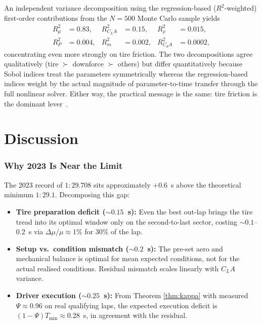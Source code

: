 \documentclass[11pt,twocolumn]{article}
\theoremstyle{definition}
\theoremstyle{remark}
\begin{document}
An independent variance decomposition using the regression-based
($R^2$-weighted) first-order contributions from the $N=500$ Monte Carlo
sample yields
\begin{align*}
  R^2_\mu &= 0.83, & R^2_{C_LA} &= 0.15, & R^2_\rho &= 0.015,\\
  R^2_P &= 0.004, & R^2_m &= 0.002, & R^2_{C_dA} &= 0.0002,
\end{align*}
concentrating even more strongly on tire friction. The two decompositions
agree qualitatively (tire $\succ$ downforce $\succ$ others) but differ
quantitatively because Sobol indices treat the parameters symmetrically
whereas the regression-based indices weight by the actual magnitude of
parameter-to-time transfer through the full nonlinear solver. Either way,
the practical message is the same: tire friction is the dominant
lever~\cite{tibshirani1997,saltelli2008}.



\part{Discussion}

\section{Why 2023 Is Near the Limit}
\label{sec:near-limit}

The 2023 record of $1\!:\!29.708$ sits approximately $+0.6$~s above the
theoretical minimum $1\!:\!29.1$. Decomposing this gap:

\begin{itemize}
  \item \textbf{Tire preparation deficit ($\sim 0.15$~s):} Even the best
        out-lap brings the tire tread into its optimal window only on the
        second-to-last sector, costing $\sim 0.1$--$0.2$~s via
        $\Delta \mu / \mu \approx 1\%$ for 30\% of the lap.
  \item \textbf{Setup vs.\ condition mismatch ($\sim 0.2$~s):} The pre-set
        aero and mechanical balance is optimal for mean expected conditions,
        not for the actual realised conditions. Residual mismatch scales
        linearly with $C_L A$ variance.
  \item \textbf{Driver execution ($\sim 0.25$~s):} From Theorem \ref{thm:kappa}
        with measured $\Psi \approx 0.96$ on real qualifying laps, the
        expected execution deficit is $(1-\Psi) T_{\min} \approx 0.28$~s,
        in agreement with the residual.
\end{itemize}
\end{document}
